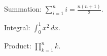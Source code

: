 Summation: $\sum_{i=1}^{n} i = \frac{n(n+1)}{2}$.

Integral: $\int_0^1 x^2 \, dx$.

Product: $\prod_{k=1}^{n} k$.
